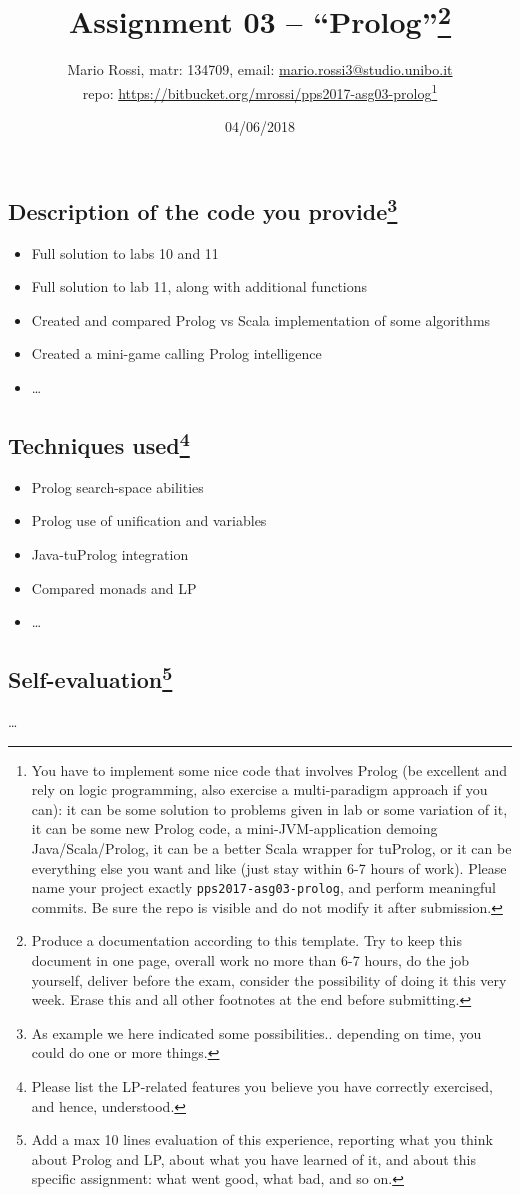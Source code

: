 \documentclass[10pt,english]{article}
\title{\vspace{-70pt}Assignment 03 -- ``Prolog''\footnote{Produce a documentation according to this template. Try to keep this document in one page, overall work no more than 6-7 hours, do the job yourself, deliver before the exam, consider the possibility of doing it this very week. Erase this and all other footnotes at the end before submitting.}}
\author{Mario Rossi, matr: 134709, email: {\url{mario.rossi3@studio.unibo.it}}\\ repo: {\url{https://bitbucket.org/mrossi/pps2017-asg03-prolog}}\footnote{You have to implement some nice code that involves Prolog (be excellent and rely on logic programming, also exercise a multi-paradigm approach if you can): it can be some solution to problems given in lab or some variation of it, it can be some new Prolog code, a mini-JVM-application demoing Java/Scala/Prolog, it can be a better Scala wrapper for tuProlog, or it can be everything else you want and like (just stay within 6-7 hours of work). Please name your project exactly \texttt{pps2017-asg03-prolog}, and perform meaningful commits. Be sure the repo is visible and do not modify it after submission.}}
\date{04/06/2018}
\begin{document}
\maketitle
\vspace{-30pt}

\subsection*{Description of the code you provide\footnote{As example we here indicated some possibilities.. depending on time, you could do one or more things.}}

\begin{itemize}
 \item Full solution to labs 10 and 11
 \item Full solution to lab 11, along with additional functions 
 \item Created and compared Prolog vs Scala implementation of some algorithms
 \item Created a mini-game calling Prolog intelligence
 \item \ldots
\end{itemize}

\subsection*{Techniques used\footnote{Please list the LP-related features you believe you have correctly exercised, and hence, understood.}}

\begin{itemize}
 \item Prolog search-space abilities
 \item Prolog use of unification and variables
 \item Java-tuProlog integration
 \item Compared monads and LP
 \item \ldots
\end{itemize}

\subsection*{Self-evaluation\footnote{Add a max 10 lines evaluation of this experience, reporting what you think about Prolog and LP, about what you have learned of it, and about this specific assignment: what went good, what bad, and so on.}}

\ldots 
 
\end{document}
